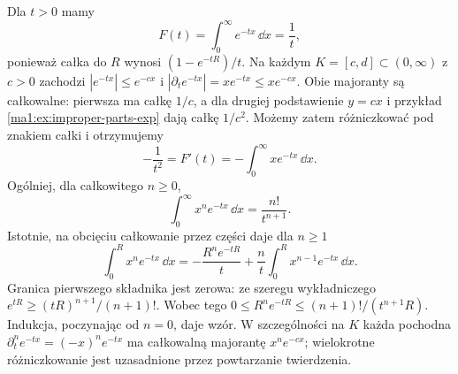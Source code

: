 \begin{przyklad}
\label{ma1:ex:parameter-exponential}
Dla $t>0$ mamy
\[
 F(t)=\int_0^\infty e^{-tx}\,\dd x=\frac1t,
\]
ponieważ całka do $R$ wynosi $(1-e^{-tR})/t$. Na każdym $K=[c,d]\subset(0,\infty)$ z $c>0$ zachodzi
$|e^{-tx}|\le e^{-cx}$ i $|\partial_t e^{-tx}|=xe^{-tx}\le xe^{-cx}$.
Obie majoranty są całkowalne: pierwsza ma całkę $1/c$, a dla drugiej podstawienie $y=cx$ i przykład \ref{ma1:ex:improper-parts-exp} dają całkę $1/c^2$. Możemy zatem różniczkować pod znakiem całki i otrzymujemy
\[
 -\frac1{t^2}=F'(t)=-\int_0^\infty xe^{-tx}\,\dd x.
\]
Ogólniej, dla całkowitego $n\ge0$,
\[
 \int_0^\infty x^n e^{-tx}\,\dd x=\frac{n!}{t^{n+1}}.
\]
Istotnie, na obcięciu całkowanie przez części daje dla $n\ge1$
\[
 \int_0^R x^n e^{-tx}\,\dd x
 =-\frac{R^n e^{-tR}}{t}+\frac{n}{t}\int_0^R x^{n-1}e^{-tx}\,\dd x.
\]
Granica pierwszego składnika jest zerowa: ze szeregu wykładniczego $e^{tR}\ge(tR)^{n+1}/(n+1)!$. Wobec tego $0\le R^ne^{-tR}\le(n+1)!/(t^{n+1}R)$. Indukcja, poczynając od $n=0$, daje wzór. W szczególności na $K$ każda pochodna $\partial_t^n e^{-tx}=(-x)^ne^{-tx}$ ma całkowalną majorantę $x^ne^{-cx}$; wielokrotne różniczkowanie jest uzasadnione przez powtarzanie twierdzenia.
\end{przyklad}

